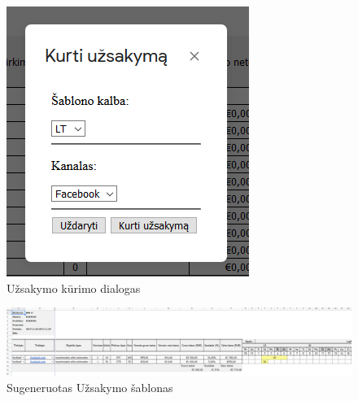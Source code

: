 \begin{figure}[H]
    \centering
    \includegraphics[scale=0.7]{Images/Screenshots/modal-order.PNG}
    \caption{Užsakymo kūrimo dialogas}
    \label{img:model}
\end{figure}

\begin{figure}[H]
    \centering
    \includegraphics[scale=0.35]{Images/Screenshots/generated-order.PNG}
    \caption{Sugeneruotas Užsakymo šablonas}
    \label{img:model}
\end{figure}

